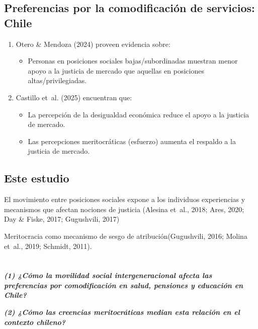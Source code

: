 \documentclass[
  spanish,
  letterpaper,
  DIV=11,
  numbers=noendperiod,
  oneside]{scrartcl}
\providecommand{\tightlist}{%
  \setlength{\itemsep}{0pt}\setlength{\parskip}{0pt}}
\begin{document}
\subsection{Preferencias por la comodificación de servicios:
Chile}\label{preferencias-por-la-comodificaciuxf3n-de-servicios-chile}

\begin{enumerate}
\def\labelenumi{\arabic{enumi}.}
\item
  Otero \& Mendoza (2024) proveen evidencia sobre:

  \begin{itemize}
  \tightlist
  \item
    Personas en posiciones sociales bajas/subordinadas muestran menor
    apoyo a la justicia de mercado que aquellas en posiciones
    altas/privilegiadas.
  \end{itemize}
\item
  Castillo et~al. (2025) encuentran que:

  \begin{itemize}
  \tightlist
  \item
    La percepción de la desigualdad económica reduce el apoyo a la
    justicia de mercado.
  \item
    Las percepciones meritocráticas (esfuerzo) aumenta el respaldo a la
    justicia de mercado.
  \end{itemize}
\end{enumerate}

\subsection{Este estudio}\label{este-estudio}

El movimiento entre posiciones sociales expone a los individuos
experiencias y mecanismos que afectan nociones de justicia (Alesina
et~al., 2018; Ares, 2020; Day \& Fiske, 2017; Gugushvili, 2017)

Meritocracia como mecanismo de sesgo de atribución(Gugushvili, 2016;
Molina et~al., 2019; Schmidt, 2011).

\section{}\label{section}

\textbf{\emph{(1) ¿Cómo la movilidad social intergeneracional afecta las
preferencias por comodificación en salud, pensiones y educación en
Chile?}}

\textbf{\emph{(2) ¿Cómo las creencias meritocráticas median esta
relación en el contexto chileno?}}
\end{document}
